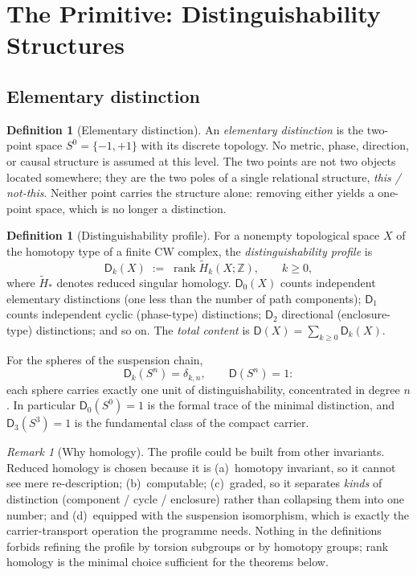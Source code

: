\documentclass[11pt,a4paper]{article}
\theoremstyle{definition}
\newtheorem{definition}[theorem]{Definition}
\theoremstyle{remark}
\newtheorem{remark}[theorem]{Remark}
\newcommand{\Sn}[1]{S^{#1}}
\newcommand{\Szero}{S^{0}}
\newcommand{\Sthree}{S^{3}}
\newcommand{\Z}{\mathbb{Z}}
\newcommand{\rH}{\widetilde H}
\newcommand{\Dd}{\mathsf{D}}
\begin{document}
\section{The Primitive: Distinguishability Structures}
\label{sec:distinguishability}

\subsection{Elementary distinction}

\begin{definition}[Elementary distinction]
An \emph{elementary distinction} is the two-point space $\Szero=\{-1,+1\}$ with its discrete
topology.  No metric, phase, direction, or causal structure is assumed at this level.  The two
points are not two objects located somewhere; they are the two poles of a single relational
structure, \emph{this / not-this}.  Neither point carries the structure alone: removing either
yields a one-point space, which is no longer a distinction.
\end{definition}

\begin{definition}[Distinguishability profile]
\label{def:profile}
For a nonempty topological space $X$ of the homotopy type of a finite CW complex, the
\emph{distinguishability profile} is
\begin{equation}
\Dd_{k}(X)\;:=\;\operatorname{rank}\rH_{k}(X;\Z),\qquad k\ge0,
\end{equation}
where $\rH_{*}$ denotes reduced singular homology.  $\Dd_{0}(X)$ counts independent elementary
distinctions (one less than the number of path components); $\Dd_{1}$ counts independent cyclic
(phase-type) distinctions; $\Dd_{2}$ directional (enclosure-type) distinctions; and so on.  The
\emph{total content} is $\Dd(X)=\sum_{k\ge0}\Dd_{k}(X)$.
\end{definition}

For the spheres of the suspension chain,
\begin{equation}
\Dd_{k}(\Sn{n})=\delta_{k,n},\qquad \Dd(\Sn{n})=1 :
\label{eq:sphere-profile}
\end{equation}
each sphere carries exactly one unit of distinguishability, concentrated in degree $n$.  In
particular $\Dd_{0}(\Szero)=1$ is the formal trace of the minimal distinction, and
$\Dd_{3}(\Sthree)=1$ is the fundamental class of the compact carrier.

\begin{remark}[Why homology]
The profile could be built from other invariants.  Reduced homology is chosen because it is
(a)~homotopy invariant, so it cannot see mere re-description; (b)~computable; (c)~graded, so it
separates \emph{kinds} of distinction (component / cycle / enclosure) rather than collapsing
them into one number; and (d)~equipped with the suspension isomorphism, which is exactly the
carrier-transport operation the programme needs.  Nothing in the definitions forbids refining
the profile by torsion subgroups or by homotopy groups; rank homology is the minimal choice
sufficient for the theorems below.
\end{remark}
\end{document}
